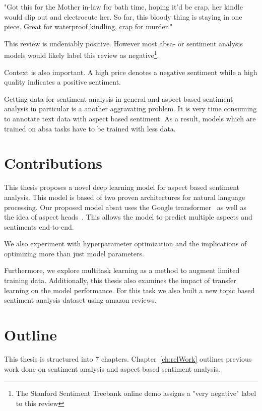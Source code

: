 \begin{center}
	"Got this for the Mother in-law for bath time, hoping it'd be crap, her kindle would slip out and electrocute her. So far, this bloody thing is staying in one piece. Great for waterproof kindling, crap for murder."
\end{center}

This review is undeniably positive. However most \gls{absa}- or sentiment analysis models would likely label this review as negative\footnote{The Stanford Sentiment Treebank online demo assigns a "very negative" label to this review}.

Context is also important. A high price denotes a negative sentiment while a high quality indicates a positive sentiment.
\medskip

Getting data for sentiment analysis in general and aspect based sentiment analysis in particular is a another aggravating problem. It is very time consuming to annotate text data with aspect based sentiment. As a result, models which are trained on \gls{absa} tasks have to be trained with less data.

\section{Contributions}

This thesis proposes a novel deep learning model for aspect based sentiment analysis. This model is based of two proven architectures for natural language processing. Our proposed model \acrfull{absat} uses the Google transformer~\cite{Vaswani2017d} as well as the idea of aspect heads~\cite{Schmitt2018}. This allows the model to predict multiple aspects and sentiments end-to-end.
\medskip

We also experiment with hyperparameter optimization and the implications of optimizing more than just model parameters.

Furthermore, we explore multitask learning as a method to augment limited training data. Additionally, this thesis also examines the impact of transfer learning on the model performance. For this task we also built a new topic based sentiment analysis dataset using amazon reviews.

\section{Outline}

This thesis is structured into 7 chapters. Chapter~\ref{ch:relWork} outlines previous work done on sentiment analysis and aspect based sentiment analysis.
\smallskip

